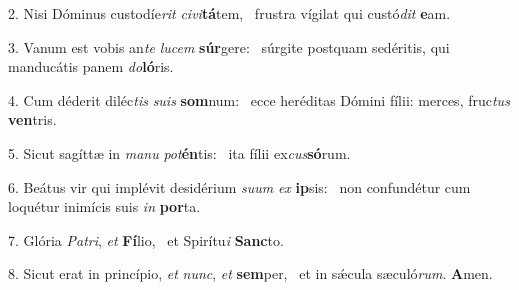2. Nisi Dóminus custodíe\textit{rit} \textit{ci}\textit{vi}\textbf{tá}tem, \ast\  frustra vígilat qui custó\textit{dit} \textbf{e}am.\

3. Vanum est vobis an\textit{te} \textit{lu}\textit{cem} \textbf{súr}gere: \ast\  súrgite postquam sedéritis, qui manducátis panem \textit{do}\textbf{ló}ris.\

4. Cum déderit diléc\textit{tis} \textit{su}\textit{is} \textbf{som}num: \ast\  ecce heréditas Dómini fílii: merces, fruc\textit{tus} \textbf{ven}tris.\

5. Sicut sagíttæ in \textit{ma}\textit{nu} \textit{pot}\textbf{én}tis: \ast\  ita fílii ex\textit{cus}\textbf{só}rum.\

6. Beátus vir qui implévit desidérium \textit{su}\textit{um} \textit{ex} \textbf{ip}sis: \ast\  non confundétur cum loquétur inimícis suis \textit{in} \textbf{por}ta.\

7. Glória \textit{Pa}\textit{tri}, \textit{et} \textbf{Fí}lio, \ast\  et Spirítu\textit{i} \textbf{Sanc}to.\

8. Sicut erat in princípio, \textit{et} \textit{nunc}, \textit{et} \textbf{sem}per, \ast\  et in sǽcula sæculó\textit{rum}. \textbf{A}men.\

